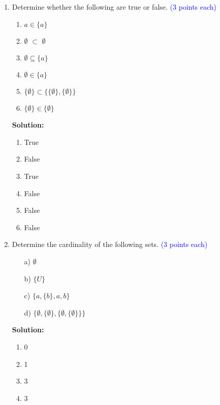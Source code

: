 \documentclass{article}
\newcommand{\pte}[1]{\textcolor{blue}{(#1 points each)}}
\newenvironment{solution}
{
\par
\color{blue}
\textbf{Solution:}
}
{
\par
}
\begin{document}
\begin{enumerate}
    \item Determine whether the following are true or false. \pte{3}
        \begin{enumerate}
            \item $a \in \{a\}$
            \item $\emptyset$ $\subset$ $\emptyset$
            \item $\emptyset \subseteq \{a\}$ 
            \item $\emptyset \in \{a\}$
            \item $\{\emptyset\} \subset \{\{\emptyset\}, \{\emptyset\}\}$
            \item $\{\emptyset\} \in \{\emptyset\}$
        \end{enumerate}
    \begin{solution}
    \begin{enumerate}
        \item True
        \item False
        \item True
        \item False
        \item False
        \item False
    \end{enumerate}
    \end{solution}

    \item Determine the cardinality of the following sets. \pte{3}
        \begin{enumerate}
            \item[a)] $\emptyset$
            
            \item[b)] $\{U\}$
            
            \item[c)] $\{a,\{b\}, a, b\}$ 
            
            \item[d)] $\{\emptyset,\{\emptyset\},\{\emptyset,\{\emptyset\}\}\}$
        
        \end{enumerate}
    \begin{solution}
    \begin{enumerate}
        \item 0
        \item 1
        \item 3
        \item 3
    \end{enumerate}
    \end{solution}


\end{enumerate}
\end{document}
